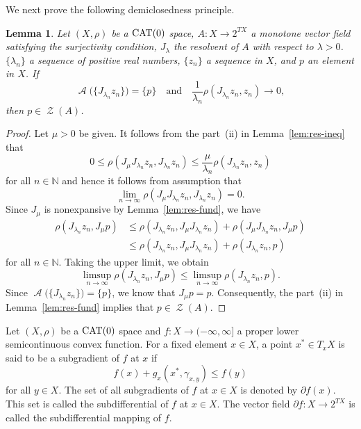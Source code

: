 \documentclass[draft]{amsart}
\numberwithin{equation}{section}
\def\N{\mathbb N}
\DeclareMathOperator{\AC}{\mathcal{A}}
\DeclareMathOperator{\Zer}{\mathcal{Z}}
\newcommand{\CAT}{\textup{CAT}}
\theoremstyle{plain}
\newtheorem{lemma}[theorem]{Lemma}
\theoremstyle{definition}
\theoremstyle{remark}
\begin{document}
We next prove the following demiclosedness principle. 

\begin{lemma}\label{lem:res-demi-a}
 Let $(X, \rho)$ be a $\CAT(0)$ space, 
 $A\colon X\to 2^{TX}$ a monotone vector field 
 satisfying the surjectivity condition, 
 $J_{\lambda}$ the resolvent of $A$ with respect to $\lambda >0$. 
 $\{\lambda_n\}$ a sequence of positive real numbers, 
 $\{z_n\}$ a sequence in $X$, and $p$ an element in $X$. 
 If 
 \[
  \AC\bigl(\{J_{\lambda_n} z_n\}\bigr)=\{p\} 
 \quad \textrm{and} \quad 
  \frac{1}{\lambda_n}\rho(J_{\lambda_n}z_n, z_n)\to 0, 
 \]
 then $p\in \Zer (A)$. 
\end{lemma}

\begin{proof}
 Let $\mu>0$ be given. 
 It follows from the part~(ii) in Lemma~\ref{lem:res-ineq} that 
 \[
  0\leq \rho(J_{\mu}J_{\lambda_n}z_n, J_{\lambda_n}z_n) 
  \leq 
  \frac{\mu}{\lambda_n} 
  \rho(J_{\lambda_n}z_n, z_n) 
 \]
 for all $n\in \N$ and hence it follows from assumption that 
 \[
  \lim_{n\to \infty} \rho(J_{\mu}J_{\lambda_n}z_n, J_{\lambda_n}z_n) = 0. 
 \]
 Since $J_{\mu}$ is nonexpansive by Lemma~\ref{lem:res-fund}, we have 
 \begin{align*}
  \rho(J_{\lambda_n}z_n, J_{\mu}p) 
  &\leq 
  \rho(J_{\lambda_n}z_n, J_{\mu}J_{\lambda_n}z_n) 
  + \rho(J_{\mu}J_{\lambda_n}z_n, J_{\mu}p) \\
  &\leq 
  \rho(J_{\lambda_n}z_n, J_{\mu}J_{\lambda_n}z_n) 
  + \rho(J_{\lambda_n}z_n, p)
 \end{align*}
 for all $n\in \N$. Taking the upper limit, we obtain 
 \[
  \limsup_{n\to \infty} \rho(J_{\lambda_n}z_n, J_{\mu}p) 
  \leq 
  \limsup_{n\to \infty} \rho(J_{\lambda_n}z_n, p). 
 \]
 Since $\AC\bigl(\{J_{\lambda_n}z_n\}\bigr)=\{p\}$, 
 we know that $J_{\mu}p = p$. Consequently, 
 the part~(ii) in Lemma~\ref{lem:res-fund} implies that 
 $p\in \Zer (A)$. 
\end{proof}

Let $(X, \rho)$ be a $\CAT(0)$ space and 
$f\colon X\to (-\infty, \infty]$ a proper lower semicontinuous 
convex function. 
For a fixed element $x\in X$, a point $x^*\in T_xX$ is said to be 
a subgradient of $f$ at $x$ if 
\[
 f(x) + g_x(x^*, \gamma_{x,y}) \leq f(y) 
\]
for all $y\in X$. The set of all subgradients of $f$ at $x\in X$ 
is denoted by $\partial f(x)$. This set is called 
the subdifferential of $f$ at $x\in X$. 
The vector field $\partial f\colon X\to 2^{TX}$ is called 
the subdifferential mapping of $f$. 
\end{document}
